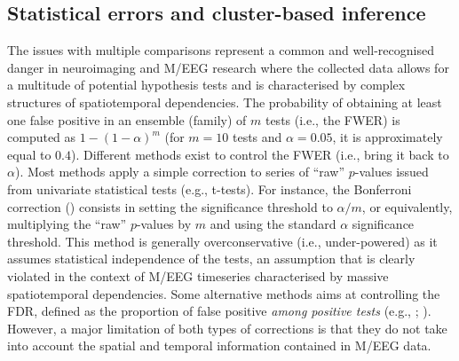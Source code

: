 \documentclass[
  doc,
  floatsintext,
  longtable,
  a4paper,
  nolmodern,
  notxfonts,
  notimes,
  donotrepeattitle,
  colorlinks=true,linkcolor=blue,citecolor=blue,urlcolor=blue]{apa7}
\begin{document}
\subsection{Statistical errors and cluster-based
inference}\label{statistical-errors-and-cluster-based-inference}

The issues with multiple comparisons represent a common and
well-recognised danger in neuroimaging and M/EEG research where the
collected data allows for a multitude of potential hypothesis tests and
is characterised by complex structures of spatiotemporal dependencies.
The probability of obtaining at least one false positive in an ensemble
(family) of \(m\) tests (i.e., the FWER) is computed as
\(1-\left(1-\alpha\right)^{m}\) (for \(m=10\) tests and \(\alpha=0.05\),
it is approximately equal to \(0.4\)). Different methods exist to
control the FWER (i.e., bring it back to \(\alpha\)). Most methods apply
a simple correction to series of ``raw'' \(p\)-values issued from
univariate statistical tests (e.g., t-tests). For instance, the
Bonferroni correction () consists in
setting the significance threshold to \(\alpha/m\), or equivalently,
multiplying the ``raw'' \(p\)-values by \(m\) and using the standard
\(\alpha\) significance threshold. This method is generally
overconservative (i.e., under-powered) as it assumes statistical
independence of the tests, an assumption that is clearly violated in the
context of M/EEG timeseries characterised by massive spatiotemporal
dependencies. Some alternative methods aims at controlling the FDR,
defined as the proportion of false positive \emph{among positive tests}
(e.g., ;
). However, a
major limitation of both types of corrections is that they do not take
into account the spatial and temporal information contained in M/EEG
data.
\end{document}
